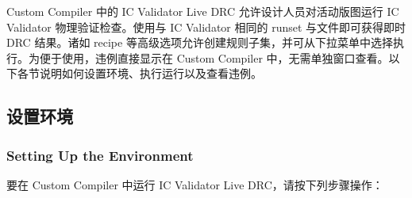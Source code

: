 Custom Compiler 中的 IC Validator Live DRC 允许设计人员对活动版图运行 IC Validator 物理验证检查。使用与 IC Validator 相同的 runset 与文件即可获得即时 DRC 结果。诸如 recipe 等高级选项允许创建规则子集，并可从下拉菜单中选择执行。为便于使用，违例直接显示在 Custom Compiler 中，无需单独窗口查看。以下各节说明如何设置环境、执行运行以及查看违例。

\subsection{设置环境}
\subsubsection*{Setting Up the Environment}

要在 Custom Compiler 中运行 IC Validator Live DRC，请按下列步骤操作：

